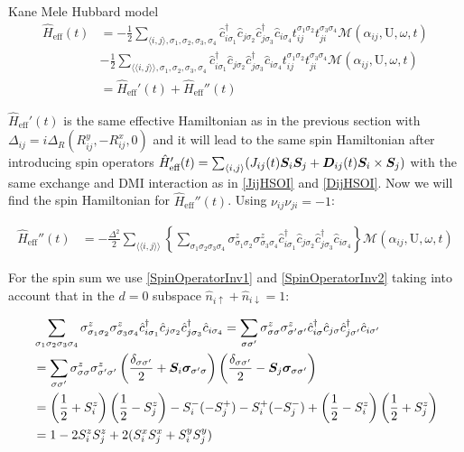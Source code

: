 \begin{section}{Kane Mele Hubbard model}
\begin{align*}
\hat{H}_{\text{eff}}(t) &= - \frac{1}{2} \sum_{\langle i,j \rangle, \sigma_1, \sigma_2, \sigma_3, \sigma_4}\hat{c}_{i \sigma_1}^\dagger \hat{c}_{j \sigma_2} \hat{c}_{j \sigma_3}^\dagger \hat{c}_{i \sigma_4} t_{ij}^{\sigma_1 \sigma_2} t_{ji}^{\sigma_3 \sigma_4} \mathcal{M}(\alpha_{ij}, \text{U}, \omega, t) \\
& - \frac{1}{2} \sum_{\langle \langle i,j \rangle \rangle, \sigma_1, \sigma_2, \sigma_3, \sigma_4}\hat{c}_{i \sigma_1}^\dagger \hat{c}_{j \sigma_2} \hat{c}_{j \sigma_3}^\dagger \hat{c}_{i \sigma_4} t_{ij}^{\sigma_1 \sigma_2} t_{ji}^{\sigma_3 \sigma_4} \mathcal{M}(\alpha_{ij}, \text{U}, \omega, t) \\
&= \hat{H}_{\text{eff}}'(t) + \hat{H}_{\text{eff}}''(t)
\end{align*}

$\hat{H}_{\text{eff}}'(t)$ is the same effective Hamiltonian as in the previous section with $\Delta_{ij} = i\Delta_R (R_{ij}^y, - R_{ij}^x, 0)$ and it will lead to the same spin Hamiltonian after introducing spin operators $\hat{H}_{\text{eff}}'(t) = \sum_{\langle i,j \rangle} (J_{ij}(t) \boldsymbol{S}_i\boldsymbol{S}_j + \boldsymbol{D}_{ij}(t)\boldsymbol{S}_i \times \boldsymbol{S}_j)$ with the same exchange and DMI interaction as in \ref{JijHSOI} and \ref{DijHSOI}. Now we will find the spin Hamiltonian for $\hat{H}_{\text{eff}}''(t)$. Using $\nu_{ij}\nu_{ji} = -1$:

\begin{align*}
\hat{H}_{\text{eff}}''(t) &= -\frac{\Delta^2}{2} \sum_{\langle \langle i,j \rangle \rangle} \left\{ \sum_{\sigma_1 \sigma_2 \sigma_3 \sigma_4} \sigma_{\sigma_1 \sigma_2}^z\sigma_{\sigma_3 \sigma_4}^z \hat{c}_{i\sigma_1}^\dagger\hat{c}_{j\sigma_2}\hat{c}_{j\sigma_3}^\dagger\hat{c}_{i\sigma_4} \right\} \mathcal{M}(\alpha_{ij}, \text{U}, \omega, t)
\end{align*}

For the spin sum we use \ref{SpinOperatorInv1} and \ref{SpinOperatorInv2} taking into account that in the $d=0$ subspace $\hat{n}_{i\uparrow}+\hat{n}_{i\downarrow} = 1$:

\begin{align*}
&\sum_{\sigma_1 \sigma_2 \sigma_3 \sigma_4} \sigma_{\sigma_1 \sigma_2}^z\sigma_{\sigma_3 \sigma_4}^z \hat{c}_{i\sigma_1}^\dagger\hat{c}_{j\sigma_2}\hat{c}_{j\sigma_3}^\dagger\hat{c}_{i\sigma_4} = \sum_{\sigma \sigma'} \sigma_{\sigma \sigma}^z\sigma_{\sigma' \sigma'}^z \hat{c}_{i\sigma}^\dagger\hat{c}_{j\sigma}\hat{c}_{j\sigma'}^\dagger\hat{c}_{i\sigma'} \\
&= \sum_{\sigma \sigma'} \sigma_{\sigma \sigma}^z\sigma_{\sigma' \sigma'}^z \left( \frac{\delta_{\sigma\sigma'}}{2} + \boldsymbol{S}_i\boldsymbol{\sigma}_{\sigma'\sigma}\right)\left( \frac{\delta_{\sigma\sigma'}}{2} - \boldsymbol{S}_j\boldsymbol{\sigma}_{\sigma\sigma'}\right) \\
&= \left( \frac{1}{2}+S_i^z \right) \left( \frac{1}{2}-S_j^z \right) - S_i^-(-S_j^+)-S_i^+(-S_j^-) + \left( \frac{1}{2}-S_i^z \right) \left( \frac{1}{2}+S_j^z \right) \\
&= 1-2S_i^zS_j^z+2(S_i^xS_j^x+S_i^yS_j^y)
\end{align*}


\end{section}
